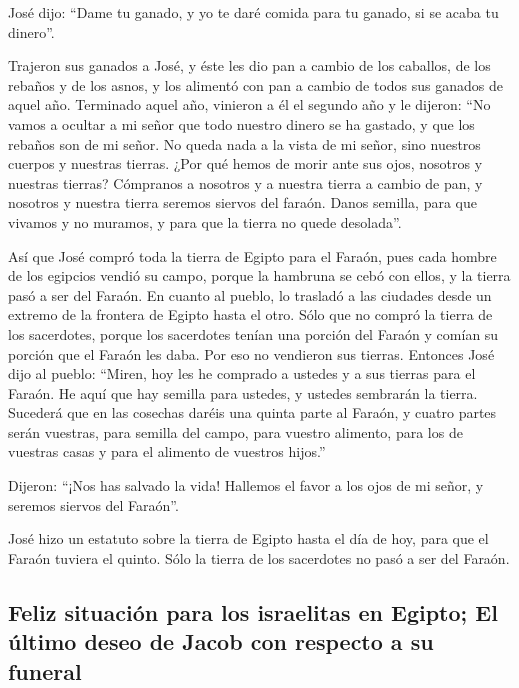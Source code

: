 \begin{paracol}{2}
 José dijo: ``Dame tu ganado, y yo te daré comida para tu
ganado, si se acaba tu dinero''.

 Trajeron sus ganados a José, y éste les dio pan a cambio
de los caballos, de los rebaños y de los asnos, y los alimentó con pan a
cambio de todos sus ganados de aquel año.  Terminado
aquel año, vinieron a él el segundo año y le dijeron: ``No vamos a
ocultar a mi señor que todo nuestro dinero se ha gastado, y que los
rebaños son de mi señor. No queda nada a la vista de mi señor, sino
nuestros cuerpos y nuestras tierras.  ¿Por qué hemos de
morir ante sus ojos, nosotros y nuestras tierras? Cómpranos a nosotros y
a nuestra tierra a cambio de pan, y nosotros y nuestra tierra seremos
siervos del faraón. Danos semilla, para que vivamos y no muramos, y para
que la tierra no quede desolada''.

 Así que José compró toda la tierra de Egipto para el
Faraón, pues cada hombre de los egipcios vendió su campo, porque la
hambruna se cebó con ellos, y la tierra pasó a ser del Faraón.
 En cuanto al pueblo, lo trasladó a las ciudades desde un
extremo de la frontera de Egipto hasta el otro.  Sólo que
no compró la tierra de los sacerdotes, porque los sacerdotes tenían una
porción del Faraón y comían su porción que el Faraón les daba. Por eso
no vendieron sus tierras.  Entonces José dijo al pueblo:
``Miren, hoy les he comprado a ustedes y a sus tierras para el Faraón.
He aquí que hay semilla para ustedes, y ustedes sembrarán la tierra.
 Sucederá que en las cosechas daréis una quinta parte al
Faraón, y cuatro partes serán vuestras, para semilla del campo, para
vuestro alimento, para los de vuestras casas y para el alimento de
vuestros hijos.''

 Dijeron: ``¡Nos has salvado la vida! Hallemos el favor a
los ojos de mi señor, y seremos siervos del Faraón''.

 José hizo un estatuto sobre la tierra de Egipto hasta el
día de hoy, para que el Faraón tuviera el quinto. Sólo la tierra de los
sacerdotes no pasó a ser del Faraón.

\hypertarget{feliz-situaciuxf3n-para-los-israelitas-en-egipto-el-uxfaltimo-deseo-de-jacob-con-respecto-a-su-funeral}{%
\subsection{Feliz situación para los israelitas en Egipto; El último
deseo de Jacob con respecto a su
funeral}\label{feliz-situaciuxf3n-para-los-israelitas-en-egipto-el-uxfaltimo-deseo-de-jacob-con-respecto-a-su-funeral}}


\end{paracol}
